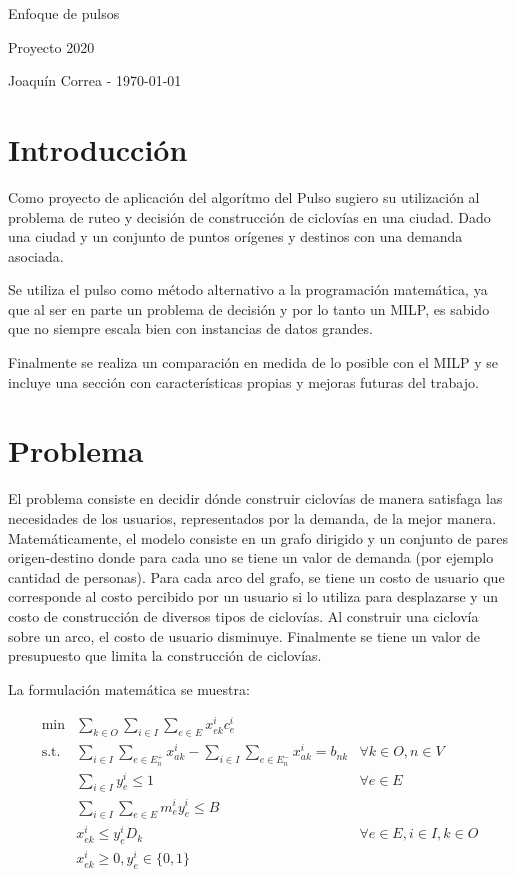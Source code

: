 \documentclass{article}
\begin{document}
  \begin{center}
    {\sc \large Enfoque de pulsos}
    
    {\sc \large Proyecto 2020}
    \linebreak

    {\rm Joaquín Correa - \today}
  \end{center}
  \section*{Introducción}

  Como proyecto de aplicación del algorítmo del Pulso sugiero su utilización al problema de ruteo y decisión de construcción de ciclovías en una ciudad. Dado una ciudad y un conjunto de puntos orígenes y destinos con una demanda asociada.

  Se utiliza el pulso como método alternativo a la programación matemática, ya que al ser en parte un problema de decisión y por lo tanto un MILP, es sabido que no siempre escala bien con instancias de datos grandes.

  Finalmente se realiza un comparación en medida de lo posible con el MILP y se incluye una sección con características propias y mejoras futuras del trabajo.

  \section*{Problema}
  El problema consiste en decidir dónde construir ciclovías de manera satisfaga las necesidades de los usuarios, representados por la demanda, de la mejor manera. Matemáticamente, el modelo consiste en un grafo dirigido y un conjunto de pares origen-destino donde para cada uno se tiene un valor de demanda (por ejemplo cantidad de personas). Para cada arco del grafo, se tiene un costo de usuario que corresponde al costo percibido por un usuario si lo utiliza para desplazarse y un costo de construcción de diversos tipos de ciclovías. Al construir una ciclovía sobre un arco, el costo de usuario disminuye. Finalmente se tiene un valor de presupuesto que limita la construcción de ciclovías.

  La formulación matemática se muestra:

  \begin{align}
    \text{min} & \sum_{k \in O} \sum_{i \in I} \sum_{e \in E} x_{ek}^i c_e^i & \label{eq:objective} \\
    \text{s.t.} & \sum_{i \in I}\sum_{e \in E_n^+} x_{ak}^i - \sum_{i \in I}\sum_{e \in E_n^-} x_{ak}^i = b_{nk} & \forall k \in O, n \in V \label{eq:flowconservation} \\
          & \sum_{i \in I} y_{e}^i \leq 1 & \forall e \in E \label{eq:onlyoneinfraactive} \\
          & \sum_{i \in I} \sum_{e \in E} m_e^i y_e^i \leq B & \label{eq:respectbudget} \\
          & x_{ek}^i \leq y_e^i  D_k & \forall e \in E, i \in I, k \in O \label{eq:restrictflowbyinfras} \\
          & x_{ek}^i \geq 0, y_e^i \in \{0,1\} &
  \end{align}
\end{document}
